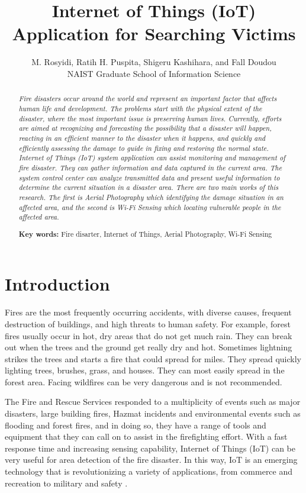 \documentclass[twocolumn,10pt]{asme2ej}
\title{Internet of Things (IoT) Application for Searching Victims}
\author{M. Rosyidi, Ratih H. Puspita, Shigeru Kashihara, and Fall Doudou\\
	NAIST Graduate School of Information Science\\
}
\begin{document}
	
	\maketitle    
	
	\begin{abstract}
		{\it  Fire disasters occur around the world and represent an important factor that affects human life and development. The problems start with the physical extent of the disaster, where the most important issue is preserving human lives. Currently, efforts are aimed at recognizing and forecasting the possibility that a disaster will happen, reacting in an efficient manner to the disaster when it happens, and quickly and efficiently assessing the damage to guide in fixing and restoring the normal state. Internet of Things (IoT) system application can assist monitoring and management of fire disaster. They can gather information and data captured in the current area. The system control center can analyze transmitted data and present useful information to determine the current situation in a disaster area. There are two main works of this research. The first is Aerial Photography which identifying the damage situation in an affected area, and the second is Wi-Fi Sensing which locating vulnerable people in the affected area.
			
			\textbf{Key words:} Fire disarter, Internet of Things, Aerial Photography, Wi-Fi Sensing
		}
	\end{abstract}
	
	\section{Introduction}
	
	Fires are the most frequently occurring accidents, with diverse causes, frequent destruction of buildings, and high threats to human safety. For example, forest fires usually occur in hot, dry areas that do not get much rain. They can break out when the trees and the ground get really dry and hot. Sometimes lightning strikes the trees and starts a fire that could spread for miles.  They spread quickly lighting trees, brushes, grass, and houses. They can most easily spread in the forest area. Facing wildfires can be very dangerous and is not recommended.
	
	The Fire and Rescue Services responded to a multiplicity of events such as major disasters, large building fires, Hazmat incidents and environmental events such as flooding and forest fires, and in doing so, they have a range of tools and equipment that they can call on to assist in the firefighting effort. With a fast response time and increasing sensing capability, Internet of Things (IoT) can be very useful for area detection of the fire disaster. In this way, IoT is an emerging technology that is revolutionizing a variety of applications, from commerce and recreation to military and safety \cite{Faisal}. 
	
\end{document}

